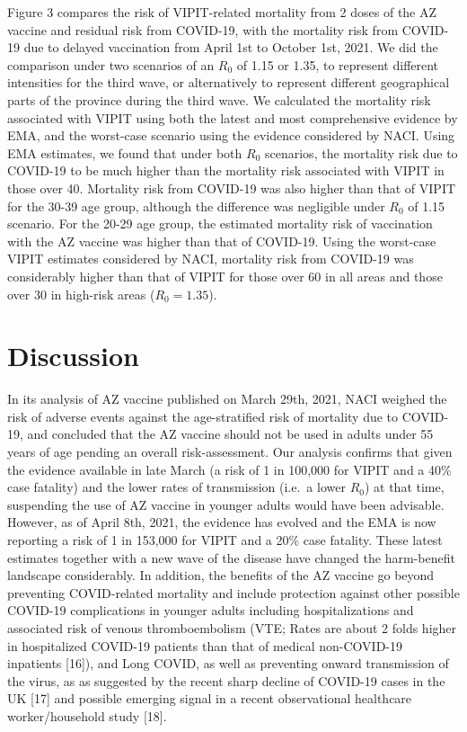\documentclass[]{elsarticle} %
\begin{document}
Figure 3 compares the risk of VIPIT-related mortality from 2 doses of
the AZ vaccine and residual risk from COVID-19, with the mortality risk
from COVID-19 due to delayed vaccination from April 1st to October 1st,
2021. We did the comparison under two scenarios of an \(R_0\) of 1.15 or
1.35, to represent different intensities for the third wave, or
alternatively to represent different geographical parts of the province
during the third wave. We calculated the mortality risk associated with
VIPIT using both the latest and most comprehensive evidence by EMA, and
the worst-case scenario using the evidence considered by NACI. Using EMA
estimates, we found that under both \(R_0\) scenarios, the mortality
risk due to COVID-19 to be much higher than the mortality risk
associated with VIPIT in those over 40. Mortality risk from COVID-19 was
also higher than that of VIPIT for the 30-39 age group, although the
difference was negligible under \(R_0\) of 1.15 scenario. For the 20-29
age group, the estimated mortality risk of vaccination with the AZ
vaccine was higher than that of COVID-19. Using the worst-case VIPIT
estimates considered by NACI, mortality risk from COVID-19 was
considerably higher than that of VIPIT for those over 60 in all areas
and those over 30 in high-risk areas (\(R_0=1.35\)).

\hypertarget{discussion}{%
\section{Discussion}\label{discussion}}

In its analysis of AZ vaccine published on March 29th, 2021, NACI
weighed the risk of adverse events against the age-stratified risk of
mortality due to COVID-19, and concluded that the AZ vaccine should not
be used in adults under 55 years of age pending an overall
risk-assessment. Our analysis confirms that given the evidence available
in late March (a risk of 1 in 100,000 for VIPIT and a 40\% case
fatality) and the lower rates of transmission (i.e.~a lower \(R_0\)) at
that time, suspending the use of AZ vaccine in younger adults would have
been advisable. However, as of April 8th, 2021, the evidence has evolved
and the EMA is now reporting a risk of 1 in 153,000 for VIPIT and a 20\%
case fatality. These latest estimates together with a new wave of the
disease have changed the harm-benefit landscape considerably. In
addition, the benefits of the AZ vaccine go beyond preventing
COVID-related mortality and include protection against other possible
COVID-19 complications in younger adults including hospitalizations and
associated risk of venous thromboembolism (VTE; Rates are about 2 folds
higher in hospitalized COVID-19 patients than that of medical
non-COVID-19 inpatients {[}16{]}), and Long COVID, as well as preventing
onward transmission of the virus, as as suggested by the recent sharp
decline of COVID-19 cases in the UK {[}17{]} and possible emerging
signal in a recent observational healthcare worker/household study
{[}18{]}.
\end{document}
